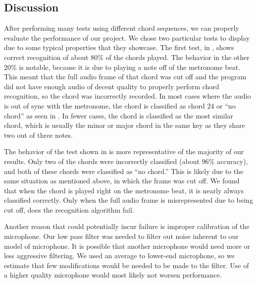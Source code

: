 \documentclass[journal]{IEEEtran}
\begin{document}
\subsection{Discussion}
After performing many tests using different chord sequences, we can properly evaluate the performance of our project.
We chose two particular tests to display due to some typical properties that they showcase.
The first test, in , shows correct recognition of about 80\% of the chords played.
The behavior in the other 20\% is notable, because it is due to playing a note off of the metronome beat.
This meant that the full audio frame of that chord was cut off and the program did not have enough audio of decent quality to properly perform chord recognition, so the chord was incorrectly recorded.
In most cases where the audio is out of sync with the metronome, the chord is classified as chord 24 or “no chord” as seen in .
In fewer cases, the chord is classified as the most similar chord, which is usually the minor or major chord in the same key as they share two out of three notes.

The behavior of the test shown in  is more representative of the majority of our results.
Only two of the chords were incorrectly classified (about 96\% accuracy), and both of these chords were classified as “no chord.” This is likely due to the same situation as mentioned above, in which the frame was cut off.
We found that when the chord is played right on the metronome beat, it is nearly always classified correctly.
Only when the full audio frame is misrepresented due to being cut off, does the recognition algorithm fail.

Another reason that could potentially incur failure is improper calibration of the microphone.
Our low pass filter was needed to filter out noise inherent to our model of microphone.
It is possible that another microphone would need more or less aggressive filtering.
We used an average to lower-end microphone, so we estimate that few modifications would be needed to be made to the filter.
Use of a higher quality microphone would most likely not worsen performance.




\end{document}
